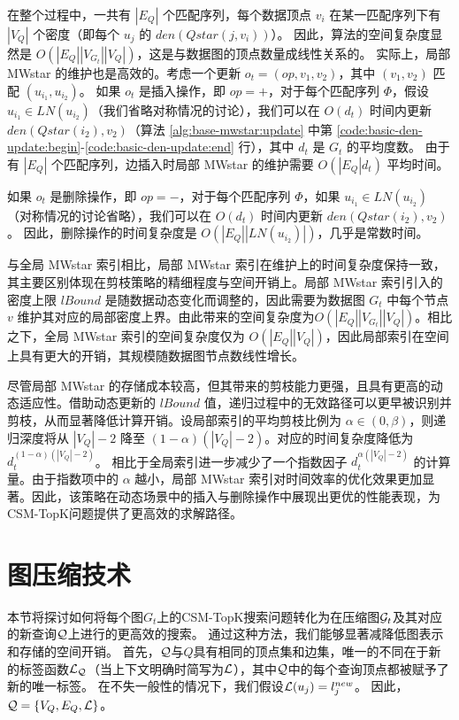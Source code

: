 在整个过程中，一共有 $|E_Q|$ 个匹配序列，每个数据顶点 $v_i$ 在某一匹配序列下有 $|V_Q|$ 个密度（即每个 $u_j$ 的 $den(Qstar(j, v_i))$）。
因此，算法的空间复杂度显然是 $O(|E_Q||V_{G_t}||V_Q|)$，这是与数据图的顶点数量成线性关系的。
实际上，局部 MWstar 的维护也是高效的。考虑一个更新 $o_t = (op, v_1, v_2)$，其中 $(v_1, v_2)$ 匹配 $(u_{i_1}, u_{i_2})$。
如果 $o_t$ 是插入操作，即 $op = +$，对于每个匹配序列 $\Phi$，假设 $u_{i_1} \in LN(u_{i_2})$（我们省略对称情况的讨论），我们可以在 $O(d_t)$ 时间内更新 $den(Qstar(i_2), v_2)$（算法 \ref{alg:base-mwstar:update} 中第 \ref{code:basic-den-update:begin}-\ref{code:basic-den-update:end} 行），其中 $d_t$ 是 $G_t$ 的平均度数。
由于有 $|E_Q|$ 个匹配序列，边插入时局部 MWstar 的维护需要 $O(|E_Q|d_t)$ 平均时间。

如果 $o_t$ 是删除操作，即 $op = -$，对于每个匹配序列 $\Phi$，如果 $u_{i_1} \in LN(u_{i_2})$（对称情况的讨论省略），我们可以在 $O(d_t)$ 时间内更新 $den(Qstar(i_2), v_2)$。
因此，删除操作的时间复杂度是 $O(|E_Q||LN(u_{i_2})|)$，几乎是常数时间。

与全局 MWstar 索引相比，局部 MWstar 索引在维护上的时间复杂度保持一致，其主要区别体现在剪枝策略的精细程度与空间开销上。局部 MWstar 索引引入的密度上限 $lBound$ 是随数据动态变化而调整的，因此需要为数据图 $G_t$ 中每个节点 $v$ 维护其对应的局部密度上界。由此带来的空间复杂度为$O(|E_Q||V_{G_t}||V_Q|)$。相比之下，全局 MWstar 索引的空间复杂度仅为 $O(|E_Q||V_Q|)$，因此局部索引在空间上具有更大的开销，其规模随数据图节点数线性增长。

尽管局部 MWstar 的存储成本较高，但其带来的剪枝能力更强，且具有更高的动态适应性。借助动态更新的 $lBound$ 值，递归过程中的无效路径可以更早被识别并剪枝，从而显著降低计算开销。设局部索引的平均剪枝比例为 $\alpha \in (0, \beta)$，则递归深度将从 $|V_Q|-2$ 降至 $(1 - \alpha)(|V_Q| - 2)$。对应的时间复杂度降低为$d_t^{(1-\alpha)(|V_Q|-2)}$。
相比于全局索引进一步减少了一个指数因子 $d_t^{\alpha(|V_Q| - 2)}$ 的计算量。由于指数项中的 $\alpha$ 越小，局部 MWstar 索引对时间效率的优化效果更加显著。因此，该策略在动态场景中的插入与删除操作中展现出更优的性能表现，为CSM-TopK问题提供了更高效的求解路径。
\section{图压缩技术}
\label{mwstar:compact-graph}

本节将探讨如何将每个图$G_t$上的CSM-TopK搜索问题转化为在压缩图$\mathcal{G}_t$及其对应的新查询$\mathcal{Q}$上进行的更高效的搜索。
通过这种方法，我们能够显著减降低图表示和存储的空间开销。
首先，$\mathcal{Q}$与$Q$具有相同的顶点集和边集，唯一的不同在于新的标签函数$\mathcal{L}_{\mathcal{Q}}$（当上下文明确时简写为$\mathcal{L}$），其中$\mathcal{Q}$中的每个查询顶点都被赋予了新的唯一标签。
在不失一般性的情况下，我们假设$\mathcal{L}(u_j) = l_j^{new}$。
因此，$\mathcal{Q} = \{V_Q, E_Q, \mathcal{L}\}$。



